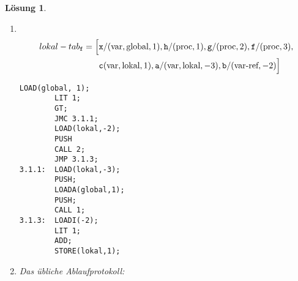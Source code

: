 \documentclass[ngerman,a4paper, 11pt]{scrartcl}
\theoremstyle{break}
\theoremstyle{nonumberplain}
\newtheorem{solution}{Lösung}
\begin{document}
\begin{solution}
	\begin{enumerate}[label=(\alph*), leftmargin=*]
		\item ~ \\[-28.5pt]
		\begin{equation*}
		\begin{aligned}
		lokal-tab_{\texttt{f}} = \Bigl[ &\texttt{x}/(\text{var},\text{global},1), \texttt{h}/(\text{proc},1), \texttt{g}/(\text{proc},2), \texttt{f}/(\text{proc},3), \\
		&\texttt{c}(\text{var},\text{lokal},1), \texttt{a}/(\text{var}, \text{lokal},-3), \texttt{b}/(\text{var-ref},-2) \Bigr]
		\end{aligned}
		\end{equation*}
\begin{lstlisting}[style=abstractmachine]
        LOAD(global, 1);
        LIT 1;
        GT;
        JMC 3.1.1;
        LOAD(lokal,-2);
        PUSH
        CALL 2;
        JMP 3.1.3;
3.1.1:	LOAD(lokal,-3);
        PUSH;
        LOADA(global,1);
        PUSH;
        CALL 1;
3.1.3: 	LOADI(-2);
        LIT 1;
        ADD;
        STORE(lokal,1);
\end{lstlisting}
		
		\item 	Das übliche Ablaufprotokoll:
		

\end{enumerate}
\end{solution}
\end{document}
